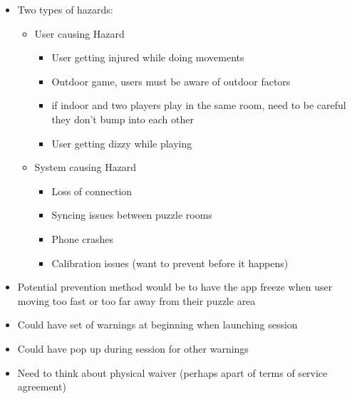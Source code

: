 \documentclass{article}
\begin{document}
\begin{itemize}
    \item Two types of hazards:
    \begin{itemize}
        \item User causing Hazard
            \begin{itemize}
                \item User getting injured while doing movements
                \item Outdoor game, users must be aware of outdoor factors
                \item if indoor and two players play in the same room, need to be careful they don't bump into each other
                \item User getting dizzy while playing
            \end{itemize}
        \item System causing Hazard
            \begin{itemize}
                \item Loss of connection
                \item Syncing issues between puzzle rooms
                \item Phone crashes
                \item Calibration issues (want to prevent before it happens)
            \end{itemize}
    \end{itemize}
    \item Potential prevention method would be to have the app freeze when user moving too fast or too far away from their puzzle area
    \item Could have set of warnings at beginning when launching session
    \item Could have pop up during session for other warnings
    \item Need to think about physical waiver (perhaps apart of terms of service agreement)
    
\end{itemize}
\end{document}
